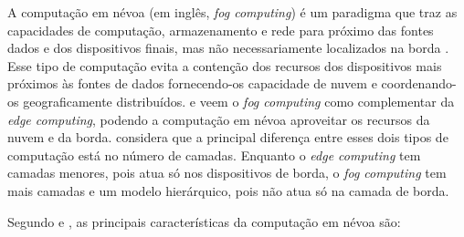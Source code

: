 A computação em névoa (em inglês, \emph{fog computing}) é um paradigma que traz
as capacidades de computação, armazenamento e rede para próximo das fontes dados
e dos dispositivos finais, mas não necessariamente localizados na borda
\cite{Bonomi2012} \cite{Dastjerdi2016} \cite{IEEECommunicationsSociety2018}.
Esse tipo de computação evita a contenção dos recursos dos dispositivos mais
próximos às fontes de dados fornecendo-os capacidade de nuvem e coordenando-os
geograficamente distribuídos.  e
 veem o \emph{fog computing} como complementar da
\emph{edge computing}, podendo a computação em névoa aproveitar os recursos da
nuvem e da borda.  considera que a
principal diferença entre esses dois tipos de computação está no número de
camadas. Enquanto o \emph{edge computing} tem camadas menores, pois atua só nos
dispositivos de borda, o \emph{fog computing} tem mais camadas e um modelo
hierárquico, pois não atua só na camada de borda.

Segundo  e , as principais
características da computação em névoa são:

